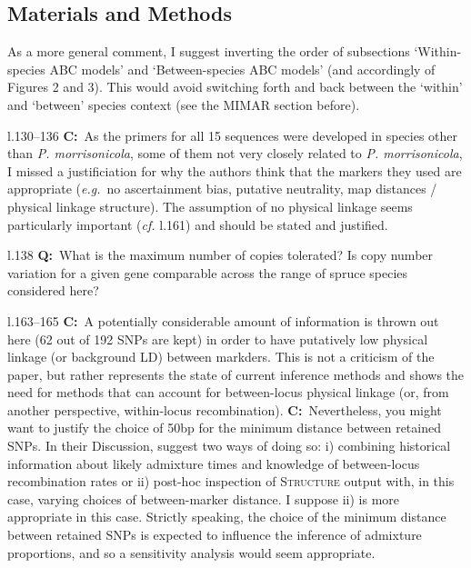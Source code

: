 \documentclass[11pt]{article}
\newenvironment{my_description}
{\begin{description}
  \setlength{\itemsep}{2pt}
  \setlength{\parskip}{0pt}
  \setlength{\parsep}{0pt}}
{\end{description}}
\newcommand{\C}{\textbf{C:}\ }
\newcommand{\Q}{\textbf{Q:}\ }
\begin{document}
\begin{my_description}
\end{my_description}



\subsection{Materials and Methods}
As a more general comment, I suggest inverting the order of subsections `Within-species ABC models' and `Between-species ABC models' (and accordingly of Figures 2 and 3). This would avoid switching forth and back between the `within' and `between' species context (see the \textsc{MIMAR} section before).

\begin{my_description}
	\item[l.130--136] \C As the primers for all 15 sequences were developed in species other than \emph{P. morrisonicola}, some of them not very closely related to \emph{P. morrisonicola}, I missed a justificiation for why the authors think that the markers they used are appropriate (\emph{e.g.}\ no ascertainment bias, putative neutrality, map distances / physical linkage structure). The assumption of no physical linkage seems particularly important (\emph{cf.} l.161) and should be stated and justified.
	\item[l.138] \Q What is the maximum number of copies tolerated? Is copy number variation for a given gene comparable across the range of spruce species considered here?
	\item[l.163--165] \C A potentially considerable amount of information is thrown out here (62 out of 192 SNPs are kept) in order to have putatively low physical linkage (or background LD) between markders. This is not a criticism of the paper, but rather represents the state of current inference methods and shows the need for methods that can account for between-locus physical linkage (or, from another perspective, within-locus recombination). \C Nevertheless, you might want to justify the choice of 50bp for the minimum distance between retained SNPs. In their Discussion, \citet[][]{Falush:2003fk}  suggest two ways of doing so: i) combining historical information about likely admixture times and knowledge of between-locus recombination rates or ii) post-hoc inspection of \textsc{Structure} output with, in this case, varying choices of between-marker distance. I suppose ii) is more appropriate in this case. Strictly speaking, the choice of the minimum distance between retained SNPs is expected to influence the inference of admixture proportions, and so a sensitivity analysis would seem appropriate.

\end{my_description}
\end{document}
